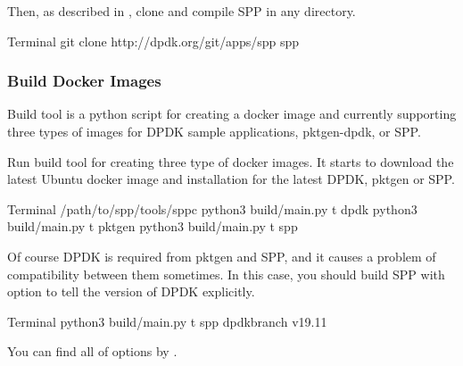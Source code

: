 \documentclass[a4paper,11pt,openany,oneside,english]{sphinxmanual}
\begin{document}
Then, as described in
{\hyperref[\detokenize{gsg/install::doc}]{}}
, clone and compile SPP in any directory.

\begin{sphinxVerbatim}[commandchars=\\\{\},formatcom=\footnotesize]
 Terminal 
 git clone http://dpdk.org/git/apps/spp
  spp
\end{sphinxVerbatim}


\subsubsection{Build Docker Images}
\label{\detokenize{tools/sppc/getting_started:build-docker-images}}\label{\detokenize{tools/sppc/getting_started:sppc-gs-build-docker-imgs}}
Build tool is a python script for creating a docker image and
currently supporting three types of images for
DPDK sample applications, pktgen-dpdk, or SPP.

Run build tool for creating three type of docker images.
It starts to download the latest Ubuntu docker image and installation
for the latest DPDK, pktgen or SPP.

\begin{sphinxVerbatim}[commandchars=\\\{\},formatcom=\footnotesize]
 Terminal 
  /path/to/spp/tools/sppc
 python3 build/main.py \PYGZhy{}t dpdk
 python3 build/main.py \PYGZhy{}t pktgen
 python3 build/main.py \PYGZhy{}t spp
\end{sphinxVerbatim}

Of course DPDK is required from pktgen and SPP, and it causes a
problem of compatibility between them sometimes.
In this case, you should build SPP with  option to tell
the version of DPDK explicitly.

\begin{sphinxVerbatim}[commandchars=\\\{\},formatcom=\footnotesize]
 Terminal 
 python3 build/main.py \PYGZhy{}t spp \PYGZhy{}\PYGZhy{}dpdk\PYGZhy{}branch v19.11
\end{sphinxVerbatim}

You can find all of options by .
\end{document}
